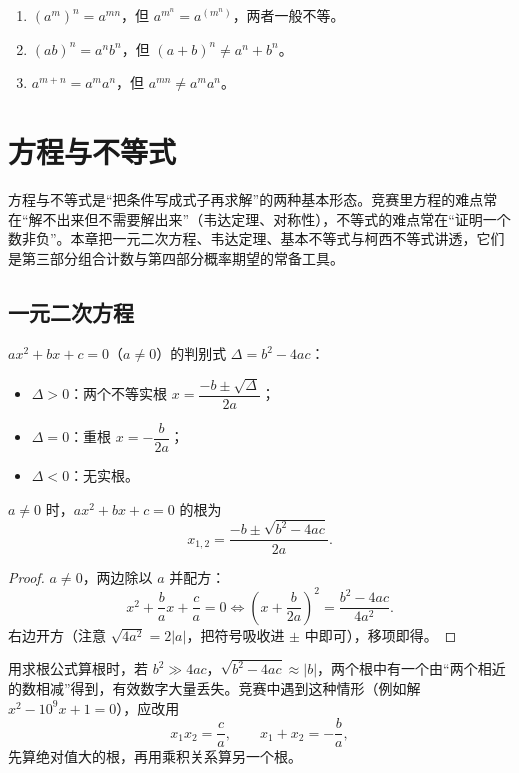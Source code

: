 \begin{pitfall}[指数运算的三条红线]
\begin{enumerate}
\item $(a^m)^n=a^{mn}$，但 $a^{m^n}=a^{(m^n)}$，两者一般不等。
\item $(ab)^n=a^nb^n$，但 $(a+b)^n\ne a^n+b^n$。
\item $a^{m+n}=a^ma^n$，但 $a^{mn}\ne a^ma^n$。
\end{enumerate}
\end{pitfall}

\chapter{方程与不等式}
\begin{chapterintro}[章节导读]
方程与不等式是“把条件写成式子再求解”的两种基本形态。竞赛里方程的难点常在“解不出来但不需要解出来”（韦达定理、对称性），不等式的难点常在“证明一个数非负”。本章把一元二次方程、韦达定理、基本不等式与柯西不等式讲透，它们是第三部分组合计数与第四部分概率期望的常备工具。
\end{chapterintro}

\section{一元二次方程}
$a x^2+bx+c=0$（$a\ne0$）的判别式 $\Delta=b^2-4ac$：
\begin{itemize}
\item $\Delta>0$：两个不等实根 $x=\dfrac{-b\pm\sqrt{\Delta}}{2a}$；
\item $\Delta=0$：重根 $x=-\dfrac b{2a}$；
\item $\Delta<0$：无实根。
\end{itemize}
\begin{theorem}[求根公式]
$a\ne0$ 时，$ax^2+bx+c=0$ 的根为
\[
x_{1,2}=\frac{-b\pm\sqrt{b^2-4ac}}{2a}.
\]
\end{theorem}
\begin{proof}
$a\ne0$，两边除以 $a$ 并配方：
\[
x^2+\frac ba x+\frac ca=0
\iff \left(x+\frac b{2a}\right)^2=\frac{b^2-4ac}{4a^2}.
\]
右边开方（注意 $\sqrt{4a^2}=2|a|$，把符号吸收进 $\pm$ 中即可），移项即得。
\end{proof}

\begin{pitfall}[数值稳定性]
用求根公式算根时，若 $b^2\gg4ac$，$\sqrt{b^2-4ac}\approx|b|$，两个根中有一个由“两个相近的数相减”得到，有效数字大量丢失。竞赛中遇到这种情形（例如解 $x^2-10^9x+1=0$），应改用
\[
x_1x_2=\frac ca,\qquad x_1+x_2=-\frac ba,
\]
先算绝对值大的根，再用乘积关系算另一个根。
\end{pitfall}

